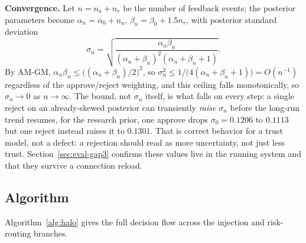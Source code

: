 \documentclass[a4paper, 11pt]{article}
\begin{document}
\textbf{Convergence.} Let $n = n_a + n_r$ be the number of feedback events; the
posterior parameters become $\alpha_n = \alpha_0 + n_a$, $\beta_n = \beta_0 +
1.5n_r$, with posterior standard deviation
\begin{equation}
  \sigma_n = \sqrt{\frac{\alpha_n \beta_n}{(\alpha_n+\beta_n)^2(\alpha_n+\beta_n+1)}}.
  \label{eq:sigma}
\end{equation}
By AM-GM, $\alpha_n\beta_n \leq \big((\alpha_n+\beta_n)/2\big)^2$, so
$\sigma_n^2 \leq 1/\big(4(\alpha_n+\beta_n+1)\big) = O(n^{-1})$ regardless of the
approve/reject weighting, and this ceiling falls monotonically, so
$\sigma_n \to 0$ as $n \to \infty$. The bound, not $\sigma_n$ itself, is what
falls on every step: a single reject on an already-skewed posterior can
transiently \emph{raise} $\sigma_n$ before the long-run trend resumes, for the
research prior, one approve drops $\sigma_0=0.1206$ to $0.1113$ but one reject
instead raises it to $0.1301$. That is correct behavior for a trust model, not a
defect: a rejection should read as more uncertainty, not just less trust.
Section~\ref{sec:eval-gap3} confirms these values live in the running system and
that they survive a connection reload.

\subsection{Algorithm}

Algorithm~\ref{alg:halo} gives the full decision flow across the injection and
risk-routing branches.
\end{document}
